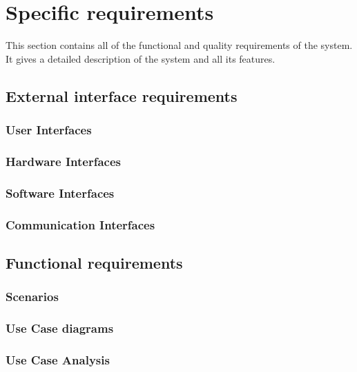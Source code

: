 \documentclass[../RASD.tex]{subfiles}
\begin{document}
    \chapter{Specific requirements}\label{ch:specific-requirements}
    This section contains all of the functional and quality requirements of the system. It gives a detailed description of the system and all its features.
        \section{External interface requirements}\label{sec:external-interface-requirements}
            \subsection{User Interfaces}\label{subsec:user-interfaces}
            \subsection{Hardware Interfaces}\label{subsec:hardware-interfaces}
            \subsection{Software Interfaces}\label{subsec:software-interfaces}
            \subsection{Communication Interfaces}\label{subsec:communication-interface}
        \section{Functional requirements}\label{sec:functional-requirements}
            \subsection{Scenarios}\label{subsec:scenarios}
            \subsection{Use Case diagrams}\label{subsec:Use-case-diagram}
            \subsection{Use Case Analysis}\label{subsec:use-case-analysis}
                
\end{document}

